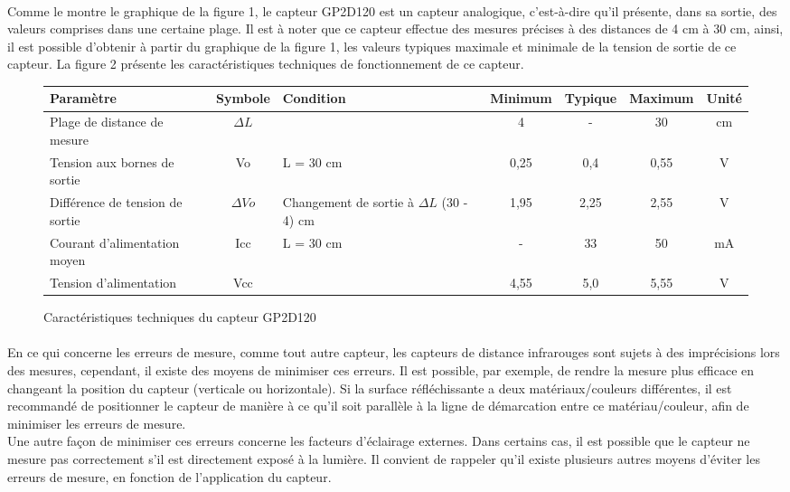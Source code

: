 \documentclass[oneside,a4paper,12pt]{article}
\begin{document}
	\paragraph{}
	Comme le montre le graphique de la figure 1, le capteur GP2D120 est un capteur analogique, c'est-à-dire qu'il présente, dans sa sortie, des valeurs comprises dans une certaine plage. Il est à noter que ce capteur effectue des mesures précises à des distances de 4 cm à 30 cm, ainsi, il est possible d'obtenir à partir du graphique de la figure 1, les valeurs typiques maximale et minimale de la tension de sortie de ce capteur. La figure 2 présente les caractéristiques techniques de fonctionnement de ce capteur.\\
	
	\begin{figure}[h]
		\centering
		\caption{Caractéristiques techniques du capteur GP2D120}
		\begin{tabular}{|p{}|c|p{}|c|c|c|c|}
			\hline
			Paramètre & Symbole & Condition & Minimum & Typique & Maximum & Unité \\
			\hline
			Plage de distance de mesure & $\Delta L$ & & 4 & - & 30 & cm \\
			\hline
			Tension aux bornes de sortie & Vo & L = 30 cm & 0,25 & 0,4 & 0,55 & V \\
			\hline
			Différence de tension de sortie & $\Delta Vo$ & Changement de sortie à
			$\Delta L$ (30 - 4) cm & 1,95 & 2,25 & 2,55 & V \\
			\hline
			Courant d'alimentation moyen & Icc & L = 30 cm & - & 33 & 50 & mA \\
			\hline
			Tension d'alimentation & Vcc &  & 4,55 & 5,0 & 5,55 & V \\
			\hline
			
			
		\end{tabular}
	\end{figure}

	\paragraph{}
	En ce qui concerne les erreurs de mesure, comme tout autre capteur, les capteurs de distance infrarouges sont sujets à des imprécisions lors des mesures, cependant, il existe des moyens de minimiser ces erreurs. Il est possible, par exemple, de rendre la mesure plus efficace en changeant la position du capteur (verticale ou horizontale). Si la surface réfléchissante a deux matériaux/couleurs différentes, il est recommandé de positionner le capteur de manière à ce qu'il soit parallèle à la ligne de démarcation entre ce matériau/couleur, afin de minimiser les erreurs de mesure.\\
	Une autre façon de minimiser ces erreurs concerne les facteurs d'éclairage externes. Dans certains cas, il est possible que le capteur ne mesure pas correctement s'il est directement exposé à la lumière. Il convient de rappeler qu'il existe plusieurs autres moyens d'éviter les erreurs de mesure, en fonction de l'application du capteur.
	
\end{document}
